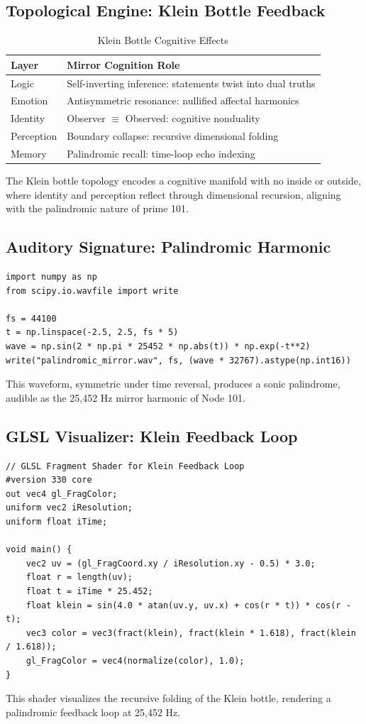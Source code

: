 \documentclass[12pt]{article}
\begin{document}
\subsection{Topological Engine: Klein Bottle Feedback}
\begin{table}
\centering
\caption{Klein Bottle Cognitive Effects}
\begin{tabular}{ll|}
\toprule
\textbf{Layer} & \textbf{Mirror Cognition Role} \\
\midrule
Logic & Self-inverting inference: statements twist into dual truths \\
Emotion & Antisymmetric resonance: nullified affectal harmonics \\
Identity & Observer $\equiv$ Observed: cognitive nonduality \\
Perception & Boundary collapse: recursive dimensional folding \\
Memory & Palindromic recall: time-loop echo indexing \\
\bottomrule
\end{tabular}
\end{table}
The Klein bottle topology encodes a cognitive manifold with no inside or outside, where identity and perception reflect through dimensional recursion, aligning with the palindromic nature of prime 101.

\subsection{Auditory Signature: Palindromic Harmonic}
\begin{lstlisting}
import numpy as np
from scipy.io.wavfile import write

fs = 44100
t = np.linspace(-2.5, 2.5, fs * 5)
wave = np.sin(2 * np.pi * 25452 * np.abs(t)) * np.exp(-t**2)
write("palindromic_mirror.wav", fs, (wave * 32767).astype(np.int16))
\end{lstlisting}
This waveform, symmetric under time reversal, produces a sonic palindrome, audible as the 25,452 Hz mirror harmonic of Node 101.

\subsection{GLSL Visualizer: Klein Feedback Loop}
\begin{lstlisting}
// GLSL Fragment Shader for Klein Feedback Loop
#version 330 core
out vec4 gl_FragColor;
uniform vec2 iResolution;
uniform float iTime;

void main() {
    vec2 uv = (gl_FragCoord.xy / iResolution.xy - 0.5) * 3.0;
    float r = length(uv);
    float t = iTime * 25.452;
    float klein = sin(4.0 * atan(uv.y, uv.x) + cos(r * t)) * cos(r - t);
    vec3 color = vec3(fract(klein), fract(klein * 1.618), fract(klein / 1.618));
    gl_FragColor = vec4(normalize(color), 1.0);
}
\end{lstlisting}
This shader visualizes the recursive folding of the Klein bottle, rendering a palindromic feedback loop at 25,452 Hz.
\end{document}
